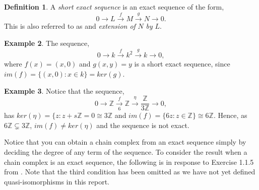 \documentclass[11.5pt, twoside, a4paper, titlepage]{report}
\providecommand{\bb}[1]{\mathbb{#1}}
\theoremstyle{definition}
\newtheorem{mydef}{Definition}[section]
\newtheorem{eg}[mydef]{Example}
\theoremstyle{plain}
\begin{document}
\begin{mydef}
A \emph{short exact sequence} is an exact sequence of the form,
\begin{equation*}
0\xrightarrow{}L\xrightarrow{f}M\xrightarrow{g}N\xrightarrow{}0.
\end{equation*}
This is also referred to as and \emph{extension of} $N$ \emph{by} $L$.
\end{mydef}

\begin{eg}
The sequence,
\begin{equation*}
0\xrightarrow{} k \xrightarrow{f} k^2 \xrightarrow{g} k \xrightarrow{} 0,
\end{equation*}
where $f(x)=(x,0)$ and $g(x,y)=y$ is a short exact sequence, since $im(f)=\{(x,0): x\in k\}=ker(g)$.
\end{eg}

\begin{eg}
Notice that the sequence, 
\begin{equation*}
0\xrightarrow{}\bb{Z}\xrightarrow[6]{f}\bb{Z}\xrightarrow{\eta}\frac{\bb{Z}}{3\bb{Z}}\xrightarrow{} 0,
\end{equation*}
has $ker(\eta)=\{z:z+s\bb{Z}=0\cong 3\bb{Z}$ and $im(f)=\{6z:z\in \bb{Z}\}\cong 6\bb{Z}$. Hence, as $6\bb{Z}\subsetneq 3\bb{Z}$, $im(f)\neq ker(\eta)$ and the sequence is not exact.
\end{eg}

Notice that you can obtain a chain complex from an exact sequence simply by deciding the degree of any term of the sequence. To consider the result when a chain complex is an exact sequence, the following is in response to Exercise 1.1.5 from \cite{Weibel}. Note that the third condition has been omitted as we have not yet defined quasi-isomorphisms in this report.
\end{document}
